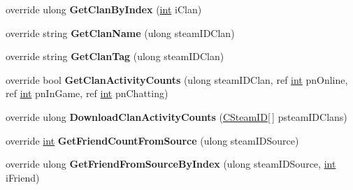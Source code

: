 \begin{DoxyCompactItemize}
\item 
\hypertarget{classValve_1_1Steamworks_1_1CSteamFriends_a9eebe5026ef528b1f9a71fbae09fe6ec}{}override ulong {\bfseries Get\+Clan\+By\+Index} (\hyperlink{SDL__thread_8h_a6a64f9be4433e4de6e2f2f548cf3c08e}{int} i\+Clan)\label{classValve_1_1Steamworks_1_1CSteamFriends_a9eebe5026ef528b1f9a71fbae09fe6ec}

\item 
\hypertarget{classValve_1_1Steamworks_1_1CSteamFriends_af758d6faa0869109f984a83338ee3445}{}override string {\bfseries Get\+Clan\+Name} (ulong steam\+I\+D\+Clan)\label{classValve_1_1Steamworks_1_1CSteamFriends_af758d6faa0869109f984a83338ee3445}

\item 
\hypertarget{classValve_1_1Steamworks_1_1CSteamFriends_a87009f1b60c9bb1f79caed0a08aed1ea}{}override string {\bfseries Get\+Clan\+Tag} (ulong steam\+I\+D\+Clan)\label{classValve_1_1Steamworks_1_1CSteamFriends_a87009f1b60c9bb1f79caed0a08aed1ea}

\item 
\hypertarget{classValve_1_1Steamworks_1_1CSteamFriends_aa64abdef5e8377ac38901b75e6092a6f}{}override bool {\bfseries Get\+Clan\+Activity\+Counts} (ulong steam\+I\+D\+Clan, ref \hyperlink{SDL__thread_8h_a6a64f9be4433e4de6e2f2f548cf3c08e}{int} pn\+Online, ref \hyperlink{SDL__thread_8h_a6a64f9be4433e4de6e2f2f548cf3c08e}{int} pn\+In\+Game, ref \hyperlink{SDL__thread_8h_a6a64f9be4433e4de6e2f2f548cf3c08e}{int} pn\+Chatting)\label{classValve_1_1Steamworks_1_1CSteamFriends_aa64abdef5e8377ac38901b75e6092a6f}

\item 
\hypertarget{classValve_1_1Steamworks_1_1CSteamFriends_a9f03aff4f7c9473a67ec4657f092ede7}{}override ulong {\bfseries Download\+Clan\+Activity\+Counts} (\hyperlink{structValve_1_1Steamworks_1_1CSteamID}{C\+Steam\+I\+D}\mbox{[}$\,$\mbox{]} psteam\+I\+D\+Clans)\label{classValve_1_1Steamworks_1_1CSteamFriends_a9f03aff4f7c9473a67ec4657f092ede7}

\item 
\hypertarget{classValve_1_1Steamworks_1_1CSteamFriends_a4ffa6d09978a1b2d0c25ae225f39281e}{}override \hyperlink{SDL__thread_8h_a6a64f9be4433e4de6e2f2f548cf3c08e}{int} {\bfseries Get\+Friend\+Count\+From\+Source} (ulong steam\+I\+D\+Source)\label{classValve_1_1Steamworks_1_1CSteamFriends_a4ffa6d09978a1b2d0c25ae225f39281e}

\item 
\hypertarget{classValve_1_1Steamworks_1_1CSteamFriends_a1bc09658c1347673b04feaaa9b94b739}{}override ulong {\bfseries Get\+Friend\+From\+Source\+By\+Index} (ulong steam\+I\+D\+Source, \hyperlink{SDL__thread_8h_a6a64f9be4433e4de6e2f2f548cf3c08e}{int} i\+Friend)\label{classValve_1_1Steamworks_1_1CSteamFriends_a1bc09658c1347673b04feaaa9b94b739}


\end{DoxyCompactItemize}
